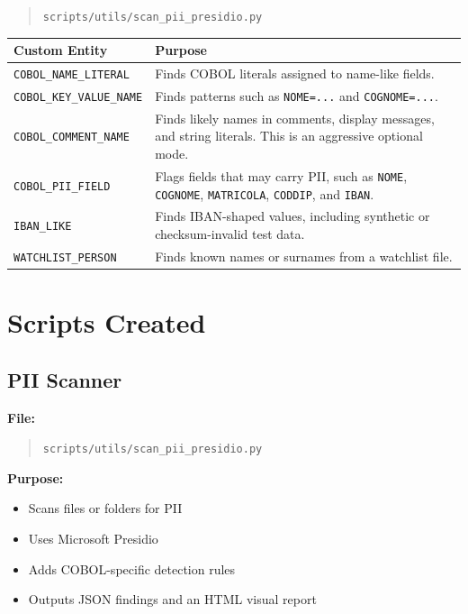﻿\documentclass[11pt,a4paper]{article}
\newcommand{\code}[1]{\texttt{#1}}
\begin{document}
\begin{quote}
\code{scripts/utils/scan\_pii\_presidio.py}
\end{quote}

\begin{longtable}{p{}p{}}
\textbf{Custom Entity} & \textbf{Purpose} \\
\hline
\code{COBOL\_NAME\_LITERAL} & Finds COBOL literals assigned to name-like fields. \\
\code{COBOL\_KEY\_VALUE\_NAME} & Finds patterns such as \code{NOME=...} and \code{COGNOME=...}. \\
\code{COBOL\_COMMENT\_NAME} & Finds likely names in comments, display messages, and string literals. This is an aggressive optional mode. \\
\code{COBOL\_PII\_FIELD} & Flags fields that may carry PII, such as \code{NOME}, \code{COGNOME}, \code{MATRICOLA}, \code{CODDIP}, and \code{IBAN}. \\
\code{IBAN\_LIKE} & Finds IBAN-shaped values, including synthetic or checksum-invalid test data. \\
\code{WATCHLIST\_PERSON} & Finds known names or surnames from a watchlist file. \\
\end{longtable}

\section{Scripts Created}

\subsection{PII Scanner}

\textbf{File:}

\begin{quote}
\code{scripts/utils/scan\_pii\_presidio.py}
\end{quote}

\textbf{Purpose:}

\begin{itemize}
  \item Scans files or folders for PII
  \item Uses Microsoft Presidio
  \item Adds COBOL-specific detection rules
  \item Outputs JSON findings and an HTML visual report
\end{itemize}
\end{document}
